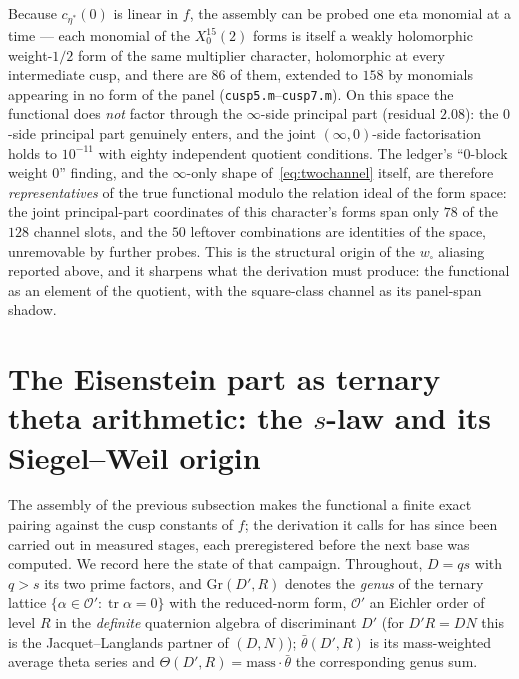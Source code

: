\documentclass[11pt,reqno]{amsart}
\theoremstyle{plain}
\theoremstyle{definition}
\DeclareMathOperator{\tr}{tr}
\begin{document}
Because $c_{\eta^*}(0)$ is linear in $f$, the assembly can be probed one eta monomial at a
time --- each monomial of the $X_0^{15}(2)$ forms is itself a weakly holomorphic weight-$1/2$
form of the same multiplier character, holomorphic at every intermediate cusp, and there are
$86$ of them, extended to $158$ by monomials appearing in no form of the panel
(\texttt{cusp5.m}--\texttt{cusp7.m}). On this space the functional does \emph{not} factor
through the $\infty$-side principal part (residual $2.08$): the $0$-side principal part
genuinely enters, and the joint $(\infty,0)$-side factorisation holds to $10^{-11}$ with
eighty independent quotient conditions. The ledger's ``$0$-block weight $0$'' finding, and
the $\infty$-only shape of~\eqref{eq:twochannel} itself, are therefore \emph{representatives}
of the true functional modulo the relation ideal of the form space: the joint principal-part
coordinates of this character's forms span only $78$ of the $128$ channel slots, and the
$50$ leftover combinations are identities of the space, unremovable by further probes. This
is the structural origin of the $w_{\square}$ aliasing reported above, and it sharpens what
the derivation must produce: the functional as an element of the quotient, with the
square-class channel as its panel-span shadow.

\section{The Eisenstein part as ternary theta arithmetic: the $s$-law and its
Siegel--Weil origin}\label{sec:slaw}

The assembly of the previous subsection makes the functional a finite exact pairing
against the cusp constants of $f$; the derivation it calls for has since been carried out
in measured stages, each preregistered before the next base was computed. We record here
the state of that campaign. Throughout, $D=qs$ with $q>s$ its two prime factors, and
$\mathrm{Gr}(D',R)$ denotes the \emph{genus} of the ternary lattice
$\{\alpha\in\mathcal{O}':\tr\alpha=0\}$ with the reduced-norm form, $\mathcal{O}'$ an
Eichler order of level $R$ in the \emph{definite} quaternion algebra of discriminant $D'$
(for $D'R=DN$ this is the Jacquet--Langlands partner of $(D,N)$); $\bar\theta(D',R)$ is
its mass-weighted average theta series and $\Theta(D',R)=\mathrm{mass}\cdot\bar\theta$
the corresponding genus sum.
\end{document}
